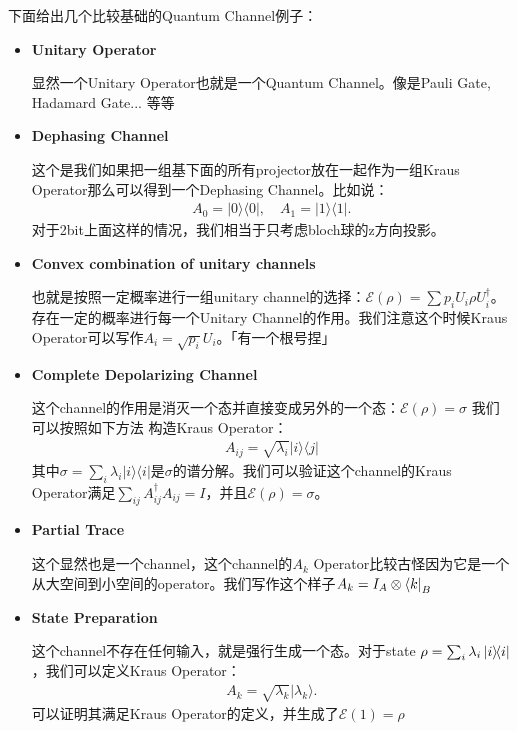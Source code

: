 下面给出几个比较基础的Quantum Channel例子：
\begin{itemize}
  \item \textbf{Unitary Operator  }

    显然一个Unitary Operator也就是一个Quantum Channel。像是Pauli Gate, Hadamard Gate... 等等
  \item \textbf{ Dephasing Channel} 

    这个是我们如果把一组基下面的所有projector放在一起作为一组Kraus Operator那么可以得到一个Dephasing Channel。比如说：
\begin{align}
  A_0=|0\rangle\langle0|,\quad A_1=|1\rangle\langle1|. 
\end{align}
    对于2bit上面这样的情况，我们相当于只考虑bloch球的z方向投影。

  \item \textbf{Convex combination of unitary channels}

    也就是按照一定概率进行一组unitary channel的选择：$ \mathcal{E}(\rho) = \sum p_i U_i \rho U_i^\dagger $。存在一定的概率进行每一个Unitary Channel的作用。我们注意这个时候Kraus Operator可以写作$ A_i = \sqrt{p_i} U_i $。「有一个根号捏」
    \item \textbf{Complete Depolarizing Channel}

      这个channel的作用是消灭一个态并直接变成另外的一个态：$ \mathcal{E}(\rho) = \sigma $ 我们可以按照如下方法 构造Kraus Operator：
    \begin{align}
      A_{ij} = \sqrt{\lambda_i} |i\rangle \langle j|
    \end{align}
    其中$ \sigma = \sum_i \lambda_i |i\rangle \langle i| $是$ \sigma $的谱分解。我们可以验证这个channel的Kraus Operator满足$ \sum_{ij} A_{ij}^\dagger A_{ij} = I $，并且$ \mathcal{E}(\rho) = \sigma $。
  \item \textbf{Partial Trace}

      这个显然也是一个channel，这个channel的$ A_k $ Operator比较古怪因为它是一个从大空间到小空间的operator。我们写作这个样子$ A_k = I_A \otimes \left\langle k \right|_B $
    \item \textbf{State Preparation} 

      这个channel不存在任何输入，就是强行生成一个态。对于state $ \rho = \sum_i \lambda_i \left| i \middle\rangle\!\middle\langle i \right| $，我们可以定义Kraus Operator：
      \begin{align}
        A_k=\sqrt{\lambda_k}|\lambda_k\rangle.
      \end{align}
      可以证明其满足Kraus Operator的定义，并生成了$ \mathcal{E}(1) = \rho $
\end{itemize}



